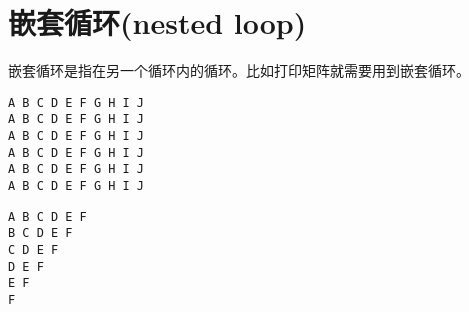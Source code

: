 \section{嵌套循环(nested loop)}
\begin{frame}[fragile]\ft{\secname}
嵌套循环是指在另一个循环内的循环。比如打印矩阵就需要用到嵌套循环。
\end{frame}

\begin{frame}[fragile]\ft{\secname}


\end{frame}

\begin{frame}[fragile]\ft{\secname}
 \begin{lstlisting}[backgroundcolor=\color{red!10}]
A B C D E F G H I J 
A B C D E F G H I J 
A B C D E F G H I J 
A B C D E F G H I J 
A B C D E F G H I J 
A B C D E F G H I J 
\end{lstlisting}
\end{frame}

\begin{frame}[fragile]\ft{\secname}


\end{frame}

\begin{frame}[fragile]\ft{\secname}
 \begin{lstlisting}
A B C D E F 
B C D E F 
C D E F 
D E F 
E F 
F 
\end{lstlisting}
\end{frame}
